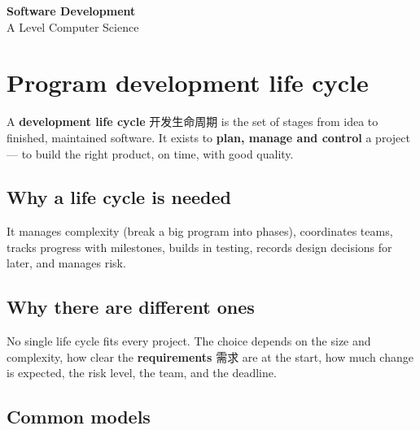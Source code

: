\documentclass[11pt]{article}
\begin{document}
\begin{center}
  {\LARGE\bfseries Software Development}\\[0.35em]
  {\large A Level Computer Science}
\end{center}
\vspace{0.6em}

\section*{Program development life cycle}

A \textbf{development life cycle} 开发生命周期 is the set of stages from idea to finished, maintained software. It exists to \textbf{plan, manage and control} a project — to build the right product, on time, with good quality.

\subsection*{Why a life cycle is needed}

It manages complexity (break a big program into phases), coordinates teams, tracks progress with milestones, builds in testing, records design decisions for later, and manages risk.

\subsection*{Why there are different ones}

No single life cycle fits every project. The choice depends on the size and complexity, how clear the \textbf{requirements} 需求 are at the start, how much change is expected, the risk level, the team, and the deadline.

\subsection*{Common models}
\end{document}
